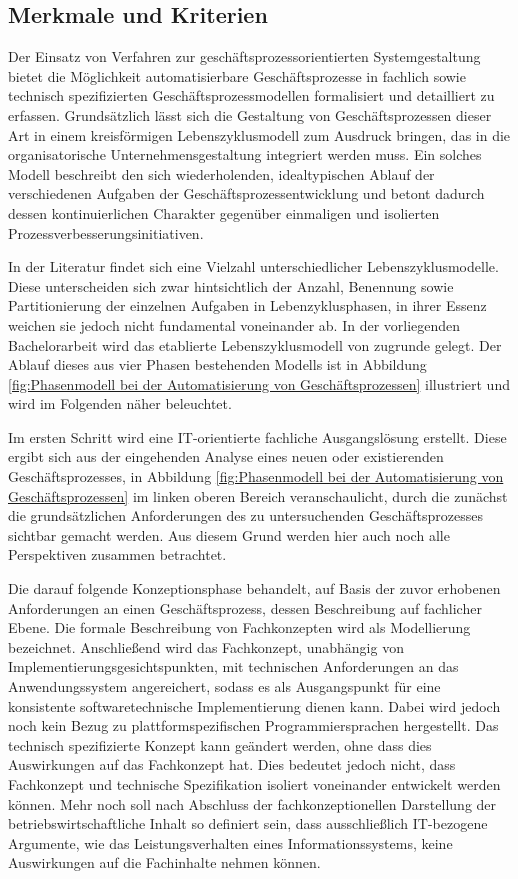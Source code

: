 \subsection{Merkmale und Kriterien}
Der Einsatz von Verfahren zur geschäftsprozessorientierten Systemgestaltung bietet die Möglichkeit automatisierbare Geschäftsprozesse in fachlich sowie technisch spezifizierten Geschäftsprozessmodellen formalisiert und detailliert zu erfassen.
Grundsätzlich lässt sich die Gestaltung von Geschäftsprozessen dieser Art in einem kreisförmigen Lebenszyklusmodell zum Ausdruck bringen, das in die organisatorische Unternehmensgestaltung integriert werden muss.
Ein solches Modell beschreibt den sich wiederholenden, idealtypischen Ablauf der verschiedenen Aufgaben der Geschäftsprozessentwicklung und betont dadurch dessen kontinuierlichen Charakter gegenüber einmaligen und isolierten Prozessverbesserungsinitiativen.

In der Literatur findet sich eine Vielzahl unterschiedlicher Lebenszyklusmodelle.
\cite{MacedodeMorais.2014} 
Diese unterscheiden sich zwar hintsichtlich der Anzahl, Benennung sowie Partitionierung der einzelnen Aufgaben in Lebenzyklusphasen, in ihrer Essenz weichen sie jedoch nicht fundamental voneinander ab.
\cite{Houy.2010}
In der vorliegenden Bachelorarbeit wird das etablierte Lebenszyklusmodell von \citeauthor{Scheer.1991}
\cite{Scheer.1991} zugrunde gelegt.
Der Ablauf dieses aus vier Phasen bestehenden Modells ist in Abbildung \ref{fig:Phasenmodell bei der Automatisierung von Geschäftsprozessen} illustriert und wird im Folgenden näher beleuchtet.

Im ersten Schritt wird eine \ac{IT}-orientierte fachliche Ausgangslösung erstellt.
Diese ergibt sich aus der eingehenden Analyse eines neuen oder existierenden Geschäftsprozesses, in Abbildung \ref{fig:Phasenmodell bei der Automatisierung von Geschäftsprozessen} im linken oberen Bereich veranschaulicht, durch die zunächst die grundsätzlichen Anforderungen des zu untersuchenden Geschäftsprozesses sichtbar gemacht werden.
\cite{Schwegmann.2002}
Aus diesem Grund werden hier auch noch alle Perspektiven zusammen betrachtet.

Die darauf folgende Konzeptionsphase behandelt, auf Basis der zuvor erhobenen Anforderungen an einen Geschäftsprozess, dessen Beschreibung auf fachlicher Ebene. 
Die formale Beschreibung von Fachkonzepten wird als Modellierung bezeichnet. 
Anschließend wird das Fachkonzept, unabhängig von Implementierungsgesichtspunkten, mit technischen Anforderungen an das Anwendungssystem angereichert, sodass es als Ausgangspunkt für eine konsistente softwaretechnische Implementierung dienen kann.
Dabei wird jedoch noch kein Bezug zu plattformspezifischen Programmiersprachen hergestellt. 
Das technisch spezifizierte Konzept kann geändert werden, ohne dass dies Auswirkungen auf das Fachkonzept hat.
Dies bedeutet jedoch nicht, dass Fachkonzept und technische Spezifikation isoliert voneinander entwickelt werden können. 
Mehr noch soll nach Abschluss der fachkonzeptionellen Darstellung der betriebswirtschaftliche Inhalt so definiert sein, dass ausschließlich \ac{IT}-bezogene Argumente, wie das Leistungsverhalten eines Informationssystems, keine Auswirkungen auf die Fachinhalte nehmen können.  

